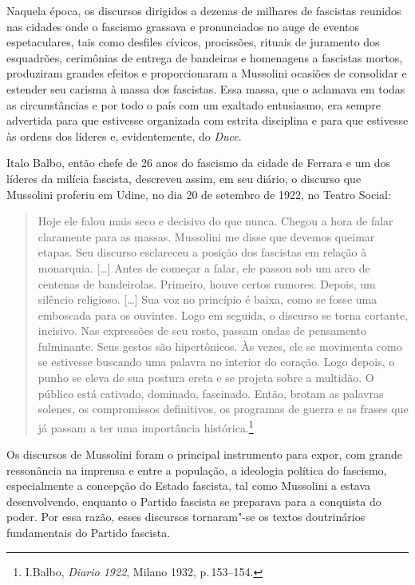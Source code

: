 Naquela época, os discursos dirigidos a dezenas de milhares de fascistas
reunidos nas cidades onde o fascismo grassava e pronunciados no auge de
eventos espetaculares, tais como desfiles cívicos, procissões, rituais
de juramento dos esquadrões, cerimônias de entrega de bandeiras e
homenagens a fascistas mortos, produziram grandes efeitos e
proporcionaram a Mussolini ocasiões de consolidar e estender seu carisma
à massa dos fascistas. Essa massa, que o aclamava em todas as
circunstâncias e por todo o país com um exaltado entusiasmo, era sempre
advertida para que estivesse organizada com estrita disciplina e para
que estivesse às ordens dos líderes e, evidentemente, do \emph{Duce}.

Italo Balbo, então chefe de 26 anos do fascismo da cidade de Ferrara e
um dos líderes da milícia fascista, descreveu assim, em seu diário, o
discurso que Mussolini proferiu em Udine, no dia 20 de setembro de 1922,
no Teatro Social:

\begin{quote}
Hoje ele falou mais seco e decisivo do que nunca. Chegou a hora de falar
claramente para as massas. Mussolini me disse que devemos queimar
etapas. Seu discurso esclareceu a posição dos fascistas em relação à
monarquia. {[}\ldots{}{]} Antes de começar a falar, ele passou sob um arco de
centenas de bandeirolas. Primeiro, houve certos rumores. Depois, um
silêncio religioso. {[}\ldots{}{]} Sua voz no princípio é baixa, como se
fosse uma emboscada para os ouvintes. Logo em seguida, o discurso se
torna cortante, incisivo. Nas expressões de seu rosto, passam ondas de
pensamento fulminante. Seus gestos são hipertônicos. Às vezes, ele se
movimenta como se estivesse buscando uma palavra no interior do coração.
Logo depois, o punho se eleva de sua postura ereta e se projeta sobre a
multidão. O público está cativado, dominado, fascinado. Então, brotam as
palavras solenes, os compromissos definitivos, os programas de guerra e
as frases que já passam a ter uma importância histórica.\footnote{I.Balbo,
  \emph{Diario 1922}, Milano 1932, p.\,153--154.}
\end{quote}

Os discursos de Mussolini foram o principal instrumento para expor, com
grande ressonância na imprensa e entre a população, a ideologia política
do fascismo, especialmente a concepção do Estado fascista, tal como
Mussolini a estava desenvolvendo, enquanto o Partido fascista se
preparava para a conquista do poder. Por essa razão, esses discursos
tornaram"-se os textos doutrinários fundamentais do Partido fascista.

